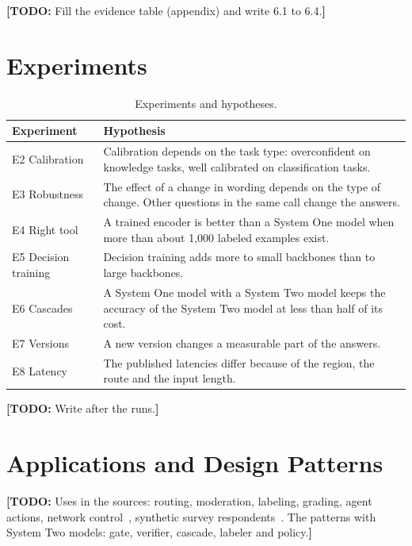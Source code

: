 \documentclass[acmsmall,nonacm,screen]{acmart}
\newcommand{\todo}[1]{{\color{red}\textbf{[TODO: }#1\textbf{]}}}
\newcommand{\sone}{System One model\xspace}
\newcommand{\stwo}{System Two model\xspace}
\newcommand{\stwos}{System Two models\xspace}
\begin{document}
\todo{Fill the evidence table (appendix) and write 6.1 to 6.4.}

\section{Experiments}
\label{sec:experiments}

\begin{table}[t]
  \caption{Experiments and hypotheses.}
  \label{tab:experiments}
  \small
  \begin{tabularx}{\linewidth}{@{}lX@{}}
    \toprule
    Experiment & Hypothesis \\
    \midrule
    E2 Calibration & Calibration depends on the task type: overconfident on knowledge tasks, well calibrated on classification tasks. \\
    E3 Robustness & The effect of a change in wording depends on the type of change. Other questions in the same call change the answers. \\
    E4 Right tool & A trained encoder is better than a \sone when more than about 1,000 labeled examples exist. \\
    E5 Decision training & Decision training adds more to small backbones than to large backbones. \\
    E6 Cascades & A \sone with a \stwo keeps the accuracy of the \stwo at less than half of its cost. \\
    E7 Versions & A new version changes a measurable part of the answers. \\
    E8 Latency & The published latencies differ because of the region, the route and the input length. \\
    \bottomrule
  \end{tabularx}
\end{table}

\todo{Write after the runs.}

\section{Applications and Design Patterns}
\label{sec:applications}
\todo{Uses in the sources: routing, moderation, labeling, grading, agent actions, network control~\cite{li2026sok}, synthetic survey respondents~\cite{lukauskas2026probable}. The patterns with \stwos: gate, verifier, cascade, labeler and policy.}
\end{document}
